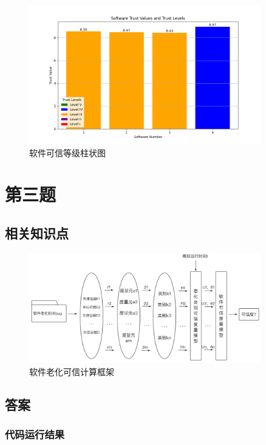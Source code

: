 \documentclass{article}
\begin{document}
\begin{figure}[H]
	\centering
	\includegraphics[width=0.9\textwidth]{img/0202.png}
	\caption{软件可信等级柱状图}
\end{figure}







\section{第三题}

\subsection{相关知识点}

\begin{figure}[H]
	\centering
	\includegraphics[width=0.9\textwidth]{img/static_3.png}
	\caption{软件老化可信计算框架}
\end{figure}

\subsection{答案}

\subsubsection{代码运行结果}
\end{document}
